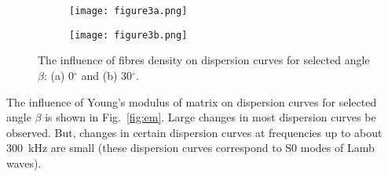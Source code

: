 \documentclass[preprint,12pt]{elsarticle}
\providecommand{\DIFaddbeginFL}{} %
\providecommand{\DIFaddendFL}{} %
\providecommand{\DIFdelbeginFL}{} %
\providecommand{\DIFdelendFL}{} %
\begin{document}
\begin{figure} [h!]
	\centering
	\DIFdelbeginFL %
\DIFdelendFL \begin{subfigure}[b]{0.49\textwidth}
		\centering
		\DIFdelbeginFL %
\DIFdelendFL \DIFaddbeginFL \texttt{[image: figure3a.png]}
		\DIFaddendFL \caption{}
		\label{fig:rhof0}
	\end{subfigure}
	\hfill
	\begin{subfigure}[b]{0.49\textwidth}
		\centering
		\DIFdelbeginFL %
\DIFdelendFL \DIFaddbeginFL \texttt{[image: figure3b.png]}
		\DIFaddendFL \caption{}
		\label{fig:rhof30}
	\end{subfigure}
	\caption{The influence of fibres density on dispersion curves for selected angle $\beta$: (a) 0$^{\circ}$ and (b) 30$^{\circ}$.} 
	\label{fig:rhof}
\end{figure}

The influence of Young's modulus of matrix on dispersion curves for selected angle $\beta$ is shown in Fig.~\ref{fig:em}. Large changes in most dispersion curves be observed. But, changes in certain dispersion curves at frequencies up to about 300~kHz are small (these dispersion curves correspond to S0 modes of Lamb waves).
\end{document}
